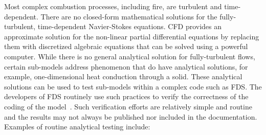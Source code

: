 \documentclass[11pt]{book}
\begin{document}
Most complex combustion processes, including fire, are turbulent and
time-dependent. There are no closed-form mathematical solutions for
the fully-turbulent, time-dependent Navier-Stokes equations. CFD
provides an approximate solution for the non-linear partial
differential equations by replacing them with discretized algebraic
equations that can be solved using a powerful computer. While there is
no general analytical solution for fully-turbulent flows, certain
sub-models address phenomenon that do have analytical solutions, for
example, one-dimensional heat conduction through a solid. These
analytical solutions can be used to test sub-models within a complex
code such as FDS. The developers of FDS routinely use such practices
to verify the correctness of the coding of the
model~\cite{Mell:1,McGrattan:4}. Such verification efforts are
relatively simple and routine and the results may not always be
published nor included in the documentation. Examples of routine
analytical testing include:
\end{document}
